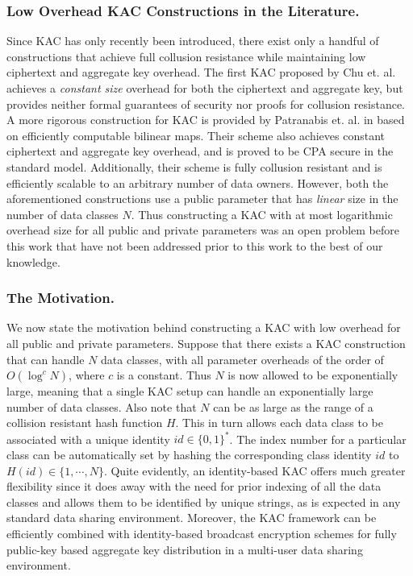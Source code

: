 \subsubsection{Low Overhead KAC Constructions in the Literature.}  Since KAC has only recently been introduced, there exist only a handful of constructions that achieve full collusion resistance while maintaining low ciphertext and aggregate key overhead. The first KAC proposed by Chu et. al. \cite{chu2014key} achieves a \emph{constant size} overhead for both the ciphertext and aggregate key, but provides neither formal guarantees of security nor proofs for collusion resistance. A more rigorous construction for KAC is provided by Patranabis et. al. in \cite{patranabis2015dynamic} based on efficiently computable bilinear maps. Their scheme also achieves constant ciphertext and aggregate key overhead, and is proved to be CPA secure in the standard model. Additionally, their scheme is fully collusion resistant and is efficiently scalable to an arbitrary number of data owners. However, both the aforementioned constructions use a public parameter that has \emph{linear} size in the number of data classes $N$. Thus constructing a KAC with at most logarithmic overhead size for all public and private parameters was an open problem before this work that have not been addressed prior to this work to the best of our knowledge. 

\subsubsection{The Motivation.} We now state the motivation behind constructing a KAC with low overhead for all public and private parameters. Suppose that there exists a KAC construction that can handle $N$ data classes, with all parameter overheads of the order of $O(\log^c N)$, where $c$ is a constant. Thus $N$ is now allowed to be exponentially large, meaning that a single KAC setup can handle an exponentially large number of data classes. Also note that $N$ can be as large as the range of a collision resistant hash function $H$. This in turn allows each data class to be associated with a unique identity $id\in\{0,1\}^{*}$. The index number for a particular class can be automatically set by hashing the corresponding class identity $id$ to $H(id)\in \{1,\cdots,N\}$. Quite evidently, an identity-based KAC offers much greater flexibility since it does away with the need for prior indexing of all the data classes and allows them to be identified by unique strings, as is expected in any standard data sharing environment. Moreover, the KAC framework can be efficiently combined with identity-based broadcast encryption schemes \cite{boneh2014low} for fully public-key based aggregate key distribution in a multi-user data sharing environment. 
 


